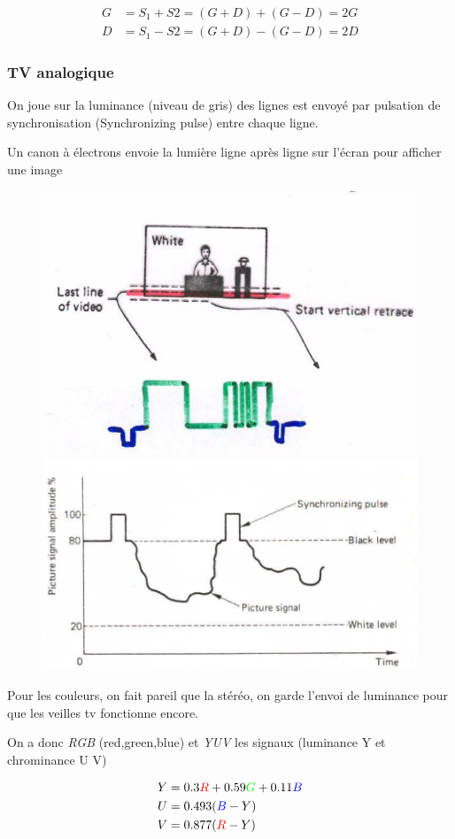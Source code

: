 			\begin{align*} 
				G &=  S_1 + S2 = (G+D) + (G-D) = 2G \\ 		
				D &=  S_1 - S2 = (G+D) - (G-D) = 2D
			\end{align*}
		
		\subsubsection{TV analogique}
		
			On joue sur la luminance (niveau de gris) des lignes est envoyé par pulsation de synchronisation (Synchronizing pulse) entre chaque ligne.

			Un canon à électrons envoie la lumière ligne après ligne sur l'écran pour afficher une image
			
\begin{figure}[H]
\centering
\begin{minipage}{.5\textwidth}
  \centering
  \includegraphics[width=.5\textwidth]{img/TV1.png}
\end{minipage}%
\begin{minipage}{.5\textwidth}
  \centering
  \includegraphics[width=.5\textwidth]{img/TV2.png}
\end{minipage}
\end{figure}
			
			Pour les couleurs, on fait pareil que la stéréo, on garde l'envoi de luminance pour que les veilles tv fonctionne encore.
			
			On a donc \textit{RGB} (red,green,blue) et \textit{YUV} les signaux (luminance Y et chrominance U V)
			
			\begin{align*} 
				Y &= 0.3\textcolor{red}{R} + 0.59\textcolor{green}{G} + 0.11\textcolor{blue}{B}\\
				U &= 0.493(\textcolor{blue}{B}-Y)\\
				V &= 0.877(\textcolor{red}{R}-Y)
			\end{align*}
